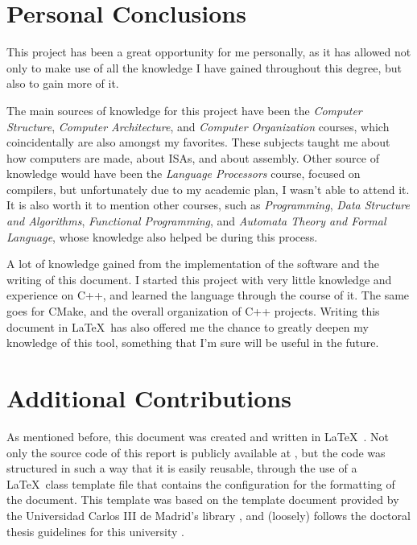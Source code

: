 \section{Personal Conclusions}\label{sec:personal-conclusions}
This project has been a great opportunity for me personally, as it has allowed not only to make use of all the knowledge I have gained throughout this degree, but also to gain more of it.

The main sources of knowledge for this project have been the \textit{Computer Structure}, \textit{Computer Architecture}, and \textit{Computer Organization} courses, which coincidentally are also amongst my favorites. These subjects taught me about how computers are made, about \glspl{ISA}, and about \gls{assembly}. Other source of knowledge would have been the \textit{Language Processors} course, focused on compilers, but unfortunately due to my academic plan, I wasn't able to attend it.
It is also worth it to mention other courses, such as \textit{Programming}, \textit{Data Structure and Algorithms}, \textit{Functional Programming}, and \textit{Automata Theory and Formal Language}, whose knowledge also helped be during this process.

A lot of knowledge gained from the implementation of the software and the writing of this document. I started this project with very little knowledge and experience on C++, and learned the language through the course of it. The same goes for CMake, and the overall organization of C++ projects. Writing this document in \LaTeX~has also offered me the chance to greatly deepen my knowledge of this tool, something that I'm sure will be useful in the future.



\section{Additional Contributions}\label{sec:contributions}
As mentioned before, this document was created and written in \LaTeX~\parencite{lamport1986latex}. Not only the source code of this report is publicly available at \myrepo, but the code was structured in such a way that it is easily reusable, through the use of a \LaTeX~class template file that contains the configuration for the formatting of the document. This template was based on the template document provided by the Universidad Carlos III de Madrid's library \parencite{UC3MthesisTemplate}, and (loosely) follows the doctoral thesis guidelines for this university \parencite{UC3MthesisStyleGuide}.

